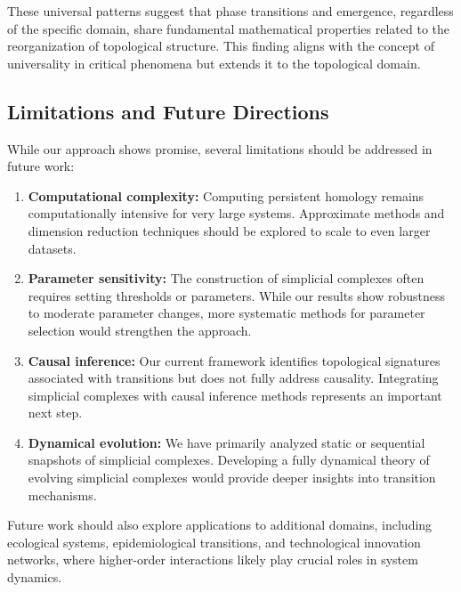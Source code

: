 These universal patterns suggest that phase transitions and emergence, regardless of the specific domain, share fundamental mathematical properties related to the reorganization of topological structure. This finding aligns with the concept of universality in critical phenomena but extends it to the topological domain.

\subsection{Limitations and Future Directions}
While our approach shows promise, several limitations should be addressed in future work:

\begin{enumerate}[leftmargin=*]
  \item \textbf{Computational complexity:} Computing persistent homology remains computationally intensive for very large systems. Approximate methods and dimension reduction techniques should be explored to scale to even larger datasets.
  
  \item \textbf{Parameter sensitivity:} The construction of simplicial complexes often requires setting thresholds or parameters. While our results show robustness to moderate parameter changes, more systematic methods for parameter selection would strengthen the approach.
  
  \item \textbf{Causal inference:} Our current framework identifies topological signatures associated with transitions but does not fully address causality. Integrating simplicial complexes with causal inference methods represents an important next step.
  
  \item \textbf{Dynamical evolution:} We have primarily analyzed static or sequential snapshots of simplicial complexes. Developing a fully dynamical theory of evolving simplicial complexes would provide deeper insights into transition mechanisms.
\end{enumerate}

Future work should also explore applications to additional domains, including ecological systems, epidemiological transitions, and technological innovation networks, where higher-order interactions likely play crucial roles in system dynamics.